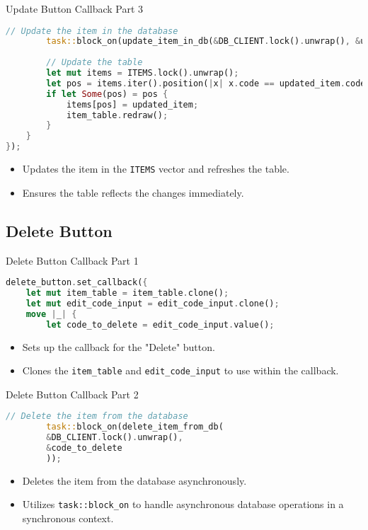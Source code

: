 \documentclass[aspectratio=169, table]{beamer}
\begin{document}
\begin{frame}[fragile]{Update Button Callback Part 3}
	\vspace{15pt}
	\begin{lstlisting}[language=Rust]
		// Update the item in the database
		task::block_on(update_item_in_db(&DB_CLIENT.lock().unwrap(), &updated_item));
		
		// Update the table
		let mut items = ITEMS.lock().unwrap();
		let pos = items.iter().position(|x| x.code == updated_item.code);
		if let Some(pos) = pos {
			items[pos] = updated_item;
			item_table.redraw();
		}
	}
});
\end{lstlisting}
\begin{itemize}
\item Updates the item in the \texttt{ITEMS} vector and refreshes the table.
\item Ensures the table reflects the changes immediately.
\end{itemize}
\end{frame}

\subsection{Delete Button}
\begin{frame}[fragile]{Delete Button Callback Part 1}
\begin{lstlisting}[language=Rust]
delete_button.set_callback({
	let mut item_table = item_table.clone();
	let mut edit_code_input = edit_code_input.clone();
	move |_| {
		let code_to_delete = edit_code_input.value();
	\end{lstlisting}
	
	\begin{itemize}
		\item Sets up the callback for the "Delete" button.
		\item Clones the \texttt{item\_table} and \texttt{edit\_code\_input} to use within the callback.
	\end{itemize}
\end{frame}

\begin{frame}[fragile]{Delete Button Callback Part 2}
	\begin{lstlisting}[language=Rust]
		// Delete the item from the database
		task::block_on(delete_item_from_db(
		&DB_CLIENT.lock().unwrap(),
		&code_to_delete
		));
	\end{lstlisting}
	
	\begin{itemize}
		\item Deletes the item from the database asynchronously.
		\item Utilizes \texttt{task::block\_on} to handle asynchronous database operations in a synchronous context.
	\end{itemize}
\end{frame}
\end{document}

